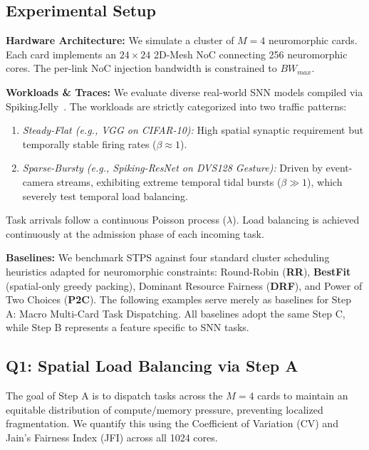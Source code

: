 \documentclass[letterpaper,twocolumn,10pt]{article}
\begin{document}
\subsection{Experimental Setup}
\textbf{Hardware Architecture:} We simulate a cluster of $M=4$ neuromorphic cards. Each card implements an $24 \times 24$ 2D-Mesh NoC connecting 256 neuromorphic cores. The per-link NoC injection bandwidth is constrained to $BW_{max}$. 

\textbf{Workloads \& Traces:} We evaluate diverse real-world SNN models compiled via SpikingJelly~\cite{fang2020spikingjelly}. The workloads are strictly categorized into two traffic patterns:
\begin{enumerate}
    \item \textit{Steady-Flat (e.g., VGG on CIFAR-10):} High spatial synaptic requirement but temporally stable firing rates ($\beta \approx 1$).
    \item \textit{Sparse-Bursty (e.g., Spiking-ResNet on DVS128 Gesture):} Driven by event-camera streams, exhibiting extreme temporal tidal bursts ($\beta \gg 1$), which severely test temporal load balancing.
\end{enumerate}
Task arrivals follow a continuous Poisson process ($\lambda$). Load balancing is achieved continuously at the admission phase of each incoming task.

\textbf{Baselines:} We benchmark STPS against four standard cluster scheduling heuristics adapted for neuromorphic constraints: Round-Robin (\textbf{RR}), \textbf{BestFit} (spatial-only greedy packing), Dominant Resource Fairness (\textbf{DRF}), and Power of Two Choices (\textbf{P2C}). The following examples serve merely as baselines for Step A: Macro Multi-Card Task Dispatching. All baselines adopt the same Step C, while Step B represents a feature specific to SNN tasks.

\subsection{Q1: Spatial Load Balancing via Step A}
\label{sec:eval_spatial_balance}
The goal of Step A is to dispatch tasks across the $M=4$ cards to maintain an equitable distribution of compute/memory pressure, preventing localized fragmentation. We quantify this using the Coefficient of Variation (CV) and Jain’s Fairness Index (JFI) across all 1024 cores.
\end{document}
